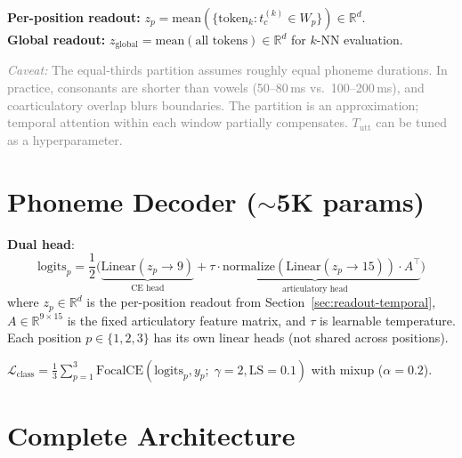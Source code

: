 \documentclass[11pt,letterpaper]{article}
\newcommand{\caveat}[1]{\par\smallskip\noindent\textcolor{gray}{\textit{Caveat:} #1}\smallskip}
\newcommand{\R}{\mathbb{R}}
\begin{document}
\textbf{Per-position readout:} $z_p = \text{mean}(\{\text{token}_k : t_c^{(k)} \in W_p\}) \in \R^d$.\\
\textbf{Global readout:} $z_{\text{global}} = \text{mean}(\text{all tokens}) \in \R^d$ for $k$-NN evaluation.

\caveat{The equal-thirds partition assumes roughly equal phoneme durations. In practice, consonants are shorter than vowels (50--80\,ms vs.\ 100--200\,ms), and coarticulatory overlap blurs boundaries. The partition is an approximation; temporal attention within each window partially compensates. $T_{\text{utt}}$ can be tuned as a hyperparameter.}


\section{Phoneme Decoder (\texorpdfstring{${\sim}$5K}{~5K} params)}

\textbf{Dual head}:
\begin{equation}
\text{logits}_p = \frac{1}{2}\bigl(\underbrace{\text{Linear}(z_p \to 9)}_{\text{CE head}} + \underbrace{\tau \cdot \text{normalize}(\text{Linear}(z_p \to 15)) \cdot A^\top}_{\text{articulatory head}}\bigr)
\end{equation}
where $z_p \in \R^d$ is the per-position readout from Section~\ref{sec:readout-temporal}, $A \in \R^{9 \times 15}$ is the fixed articulatory feature matrix, and $\tau$ is learnable temperature. Each position $p \in \{1,2,3\}$ has its own linear heads (not shared across positions).

$\mathcal{L}_{\text{class}} = \frac{1}{3}\sum_{p=1}^{3} \text{FocalCE}(\text{logits}_p, y_p;\; \gamma{=}2, \text{LS}{=}0.1)$
with mixup ($\alpha{=}0.2$).


\section{Complete Architecture}
\end{document}

